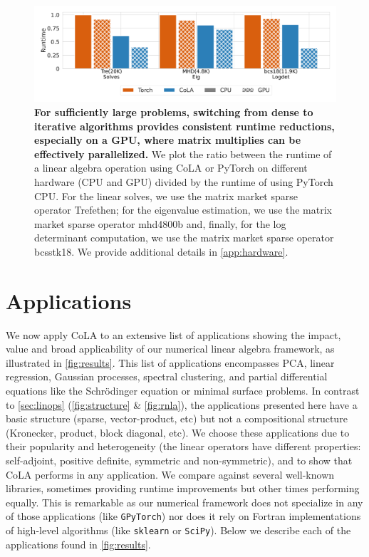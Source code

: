 \documentclass{article}
\begin{document}
\begin{figure}[t!]
    \centering
      \hspace{-2em}
    \includegraphics[width=1.0\textwidth]{./figs/hardware.pdf}
    \caption{
    \textbf{
    For sufficiently large problems, switching from dense to iterative algorithms provides consistent runtime reductions, especially on a GPU, where matrix multiplies can be effectively parallelized.
    }
    We plot the ratio between the runtime of a linear algebra operation using CoLA or PyTorch on different hardware (CPU and GPU) divided by the runtime of using PyTorch CPU.
    For the linear solves, we use the matrix market sparse operator Trefethen;
    for the eigenvalue estimation, we use the matrix market sparse operator mhd4800b and, finally,
    for the log determinant computation, we use the matrix market sparse operator bcsstk18.
    We provide additional details in \autoref{app:hardware}.
    }
    \vspace{-1.5em}
    \label{fig:hardware}
\end{figure}

\section{Applications} \label{sec:applications}

We now apply CoLA to an extensive list of applications showing the impact, value and broad applicability of our numerical linear algebra framework, as illustrated in \autoref{fig:results}.
This list of applications encompasses PCA, linear regression, Gaussian processes, spectral clustering, and partial differential equations like
the Schr\"{o}dinger equation or minimal surface problems.
In contrast to \autoref{sec:linops} (\autoref{fig:structure} \& \autoref{fig:rnla}), the applications presented here have a basic structure (sparse, vector-product, etc)
but not a compositional structure (Kronecker, product, block diagonal, etc).
We choose these applications due to their popularity and heterogeneity (the linear operators have different properties: self-adjoint, positive definite, symmetric and non-symmetric), and to show that CoLA performs in any application.
We compare against several well-known libraries,
sometimes providing runtime improvements but other times performing equally.
This is remarkable as our numerical framework does not specialize in any of those applications (like \texttt{GPyTorch})
nor does it rely on Fortran implementations of high-level algorithms
(like \texttt{sklearn} or \texttt{SciPy}).
Below we describe each of the applications found in \autoref{fig:results}.
\end{document}
